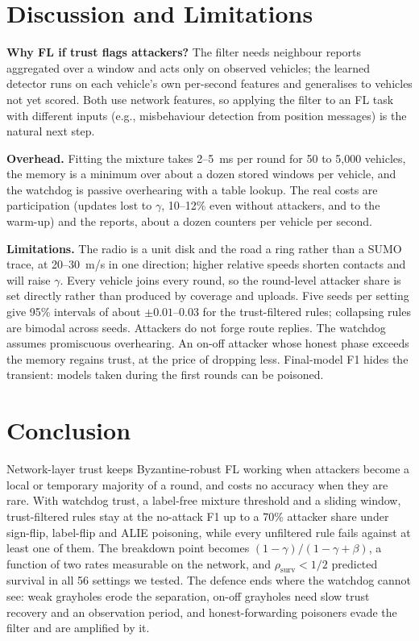 \documentclass[conference]{IEEEtran}
\newcommand{\rsurv}{\rho_{\mathrm{surv}}}
\begin{document}
\section{Discussion and Limitations}

\textbf{Why FL if trust flags attackers?} The filter needs neighbour reports aggregated over a window and acts only on
observed vehicles; the learned detector runs on each vehicle's own per-second features and generalises to vehicles
not yet scored. Both use network features, so applying the filter to an FL task with different inputs (e.g.,
misbehaviour detection from position messages) is the natural next step.

\textbf{Overhead.} Fitting the mixture takes 2--5~ms per round for 50 to 5{,}000 vehicles, the memory is a minimum over
about a dozen stored windows per vehicle, and the watchdog is passive overhearing with a table lookup. The real costs
are participation (updates lost to $\gamma$, 10--12\% even without attackers, and to the warm-up) and the reports,
about a dozen counters per vehicle per second.

\textbf{Limitations.} The radio is a unit disk and the road a ring rather than a SUMO trace, at 20--30~m/s in one
direction; higher relative speeds shorten contacts and will raise $\gamma$. Every vehicle joins every round, so the
round-level attacker share is set directly rather than produced by coverage and uploads. Five seeds per setting give
95\% intervals of about $\pm 0.01$--0.03 for the trust-filtered rules; collapsing rules are bimodal across seeds. Attackers do not forge route replies. The
watchdog assumes promiscuous overhearing. An on-off attacker whose honest phase exceeds the memory regains trust, at
the price of dropping less. Final-model F1 hides the transient: models taken during the first rounds can be poisoned.

\section{Conclusion}

Network-layer trust keeps Byzantine-robust FL working when attackers become a local or temporary majority of a
round, and costs no accuracy when they are rare. With watchdog trust, a label-free mixture threshold and a sliding
window, trust-filtered rules stay at the no-attack F1 up to a 70\% attacker share under sign-flip, label-flip and ALIE
poisoning, while every unfiltered rule fails against at least one of them. The breakdown point becomes
$(1-\gamma)/(1-\gamma+\beta)$, a function of two rates measurable on the network, and $\rsurv < 1/2$ predicted survival
in all 56 settings we tested. The defence ends where the watchdog cannot see: weak grayholes erode the
separation, on-off grayholes need slow trust recovery and an observation period, and honest-forwarding poisoners evade
the filter and are amplified by it.



\end{document}
